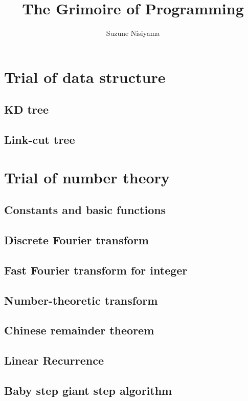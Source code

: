 \documentclass[UTF8,a4paper]{report}
\title{The Grimoire of Programming}
\date{}
\author{Suzune Nisiyama}
\begin{document}
	\tableofcontents
	\chapter{Trial of data structure}
		\section{KD tree}
			
		\section{Link-cut tree}
			
	\chapter{Trial of number theory}
		\section{Constants and basic functions}
			
		\section{Discrete Fourier transform}
			
		\section{Fast Fourier transform for integer}
			
		\section{Number-theoretic transform}
			
		\section{Chinese remainder theorem}
			
		\section{Linear Recurrence}
			
		\section{Baby step giant step algorithm}
			
\end{document}
